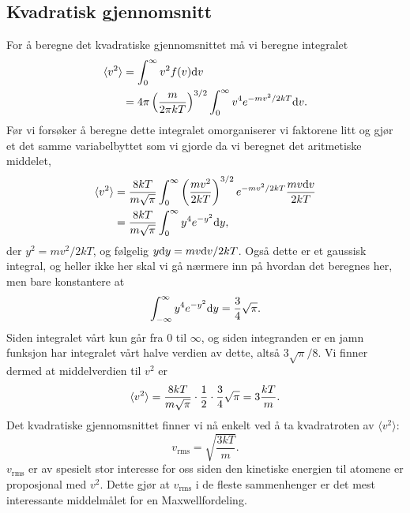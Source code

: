 \subsection{Kvadratisk gjennomsnitt}
For å beregne det kvadratiske gjennomsnittet må vi beregne integralet
\begin{displaymath}
\begin{aligned}
	\langle v^2 \rangle &= \int_0^\infty v^2 f(v) \text{d} v \\
	&= 4\pi\left(\frac{m}{2\pi kT}\right)^{3/2} \int_0^\infty v^4 e^{-mv^2/2kT}\text{d} v.
\end{aligned}
\end{displaymath}
Før vi forsøker å beregne dette integralet omorganiserer vi faktorene litt og gjør et det samme variabelbyttet som vi gjorde da vi beregnet det aritmetiske middelet,
\begin{displaymath}
\begin{aligned}
	\langle v^2 \rangle &= \frac{8kT}{m\sqrt{\pi}} \int_0^\infty \left(\frac{mv^2}{2 kT}\right)^{3/2}  e^{-mv^2/2kT}\frac{mv\text{d} v}{2kT} \\
	&=  \frac{8kT}{m\sqrt{\pi}} \int_0^\infty y^4 e^{-y^2} \text{d} y,
\end{aligned}
\end{displaymath}
der $y^2 = mv^2/2kT$, og følgelig $y\text{d} y = mv\text{d} v/2kT$. Også dette er et gaussisk integral, og heller ikke her skal vi gå nærmere inn på hvordan det beregnes her, men bare konstantere at
\begin{displaymath}
	\int_{-\infty}^\infty y^4e^{-y^2} \text{d} y = \frac{3}{4}\sqrt{\pi}.
\end{displaymath}
Siden integralet vårt kun går fra $0$ til $\infty$, og siden integranden er en jamn funksjon har integralet vårt halve verdien av dette, altså $3\sqrt{\pi}/8$. Vi finner dermed at middelverdien til $v^2$ er
\begin{displaymath}
	\langle v^2 \rangle = \frac{8kT}{m\sqrt{\pi}}\cdot\frac{1}{2}\cdot\frac{3}{4}\sqrt{\pi} = 3\frac{kT}{m}.
\end{displaymath}
Det kvadratiske gjennomsnittet finner vi nå enkelt ved å ta kvadratroten av $\langle v^2 \rangle$:
\begin{equation}
	v_\text{rms} = \sqrt{\frac{3kT}{m}}.
\end{equation}
$v_\text{rms}$ er av spesielt stor interesse for oss siden den kinetiske energien til atomene er proposjonal med $v^2$. Dette gjør at $v_\text{rms}$ i de fleste sammenhenger er det mest interessante middelmålet for en Maxwellfordeling.


